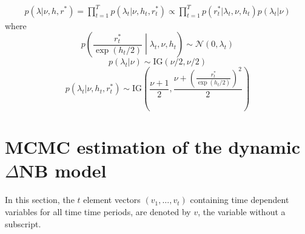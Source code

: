 \documentclass[12pt]{article}
\begin{document}
\begin{eqnarray}
p(\lambda | \nu,  h,  r^{*})=\prod \limits_{t=1}^{T}  p(\lambda_t | \nu,  h_t,  r^{*}_t)\propto \prod \limits_{t=1}^{T} p( r^{*}_t | \lambda_t,  \nu,  h_t)p(\lambda_t| \nu)
\end{eqnarray}
where 
\begin{equation}
p\left( \frac{r^{*}_t}{\exp(h_t/2)} \middle| \lambda_t,  \nu,  h_t\right) \sim \mathcal{N}(0,\lambda_t)
\end{equation}
\begin{equation}
p(  \lambda_t|  \nu ) \sim \text{IG}(\nu/2,\nu/2)
\end{equation}
\begin{equation}
p(\lambda_t | \nu,  h_t,  r^{*}_t)\sim \text{IG}\left(\frac{\nu+1}{2},\frac{\nu+\left(\frac{r^{*}_t}{\exp(h_t/2)}\right)^{2}}{2}\right)
\end{equation}

\section{MCMC estimation of the dynamic $\Delta$NB model} \label{secapp:mcmcdnb} 

In this section,  the $t$ element vectors $(v_1, \ldots, v_t)$ containing time dependent variables for all time time periods, are denoted by $v$, the variable without a subscript.
\label{c_sec:dnb_appendix}
\end{document}
